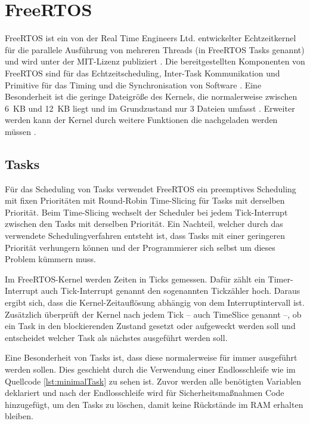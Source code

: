 \section{FreeRTOS}
FreeRTOS ist ein von der Real Time Engineers Ltd. entwickelter Echtzeitkernel für die parallele Ausführung von mehreren Threads (in FreeRTOS Tasks genannt) und wird unter der MIT-Lizenz publiziert \cites[S.~2]{barryFreeRTOS}{freeRTOSAbout}{freeRTOSLicense}. Die bereitgestellten Komponenten von FreeRTOS sind für das Echtzeitscheduling, Inter-Task Kommunikation und Primitive für das Timing und die Synchronisation von Software \cite{freeRTOSAbout}. Eine Besonderheit ist die geringe Dateigröße des Kernels, die normalerweise zwischen 6~KB und 12~KB liegt und im Grundzustand nur 3 Dateien umfasst \cites{freeRTOSKernel}{freeRTOSSource}. Erweiter werden kann der Kernel durch weitere Funktionen die nachgeladen werden müssen \cite{freeRTOSSource}.

\subsection{Tasks}
Für das Scheduling von Tasks verwendet FreeRTOS ein preemptives Scheduling mit fixen Prioritäten mit Round-Robin Time-Slicing für Tasks mit derselben Priorität. Beim Time-Slicing wechselt der Scheduler bei jedem Tick-Interrupt zwischen den Tasks mit derselben Priorität. Ein Nachteil, welcher durch das verwendete Schedulingverfahren entsteht ist, dass Tasks mit einer geringeren Priorität verhungern können und der Programmierer sich selbst um dieses Problem kümmern muss. \cites{freeRTOSFAQScheduling}{freeRTOSScheduling}

Im FreeRTOS-Kernel werden Zeiten in Ticks gemessen. Dafür zählt ein Timer-Interrupt auch Tick-Interrupt genannt den sogenannten Tickzähler hoch. Daraus ergibt sich, dass die Kernel-Zeitauflösung abhängig von dem Interruptintervall ist. Zusätzlich überprüft der Kernel nach jedem Tick -- auch TimeSlice genannt --, ob ein Task in den blockierenden Zustand gesetzt oder aufgeweckt werden soll und entscheidet welcher Task als nächstes ausgeführt werden soll. \cites[S.~61]{barryFreeRTOS}{freeRTOSTick}

Eine Besonderheit von Tasks ist, dass diese normalerweise für immer ausgeführt werden sollen. Dies geschieht durch die Verwendung einer Endlosschleife wie im Quellcode \ref{lst:minimalTask} zu sehen ist. Zuvor werden alle benötigten Variablen deklariert und nach der Endlosschleife wird für Sicherheitsmaßnahmen Code hinzugefügt, um den Tasks zu löschen, damit keine Rückstände im \acs{RAM} erhalten bleiben. \cite[S.~46]{barryFreeRTOS}

